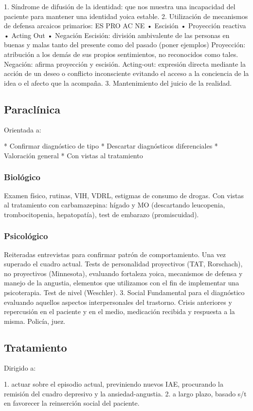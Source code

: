 \documentclass{scrbook}
\begin{document}
1. Síndrome de difusión de la identidad: que nos muestra una incapacidad del paciente para mantener una identidad yoica estable.
2. Utilización de mecanismos de defensa arcaicos primarios: ES PRO AC NE • Escisión • Proyección reactiva • Acting Out • Negación Escisión: división ambivalente de las personas en buenas y malas tanto del presente como del pasado (poner ejemplos) Proyección: atribución a los demás de sus propios sentimientos, no reconocidos como tales. Negación: afirma proyección y escisión. Acting-out: expresión directa mediante la acción de un deseo o conflicto inconsciente evitando el acceso a la conciencia de la idea o el afecto que la acompaña.
3. Mantenimiento del juicio de la realidad.
\subsection*{Paraclínica}
Orientada a:

* Confirmar diagnóstico de tipo
* Descartar diagnósticos diferenciales
* Valoración general
* Con vistas al tratamiento

\subsubsection*{Biológico}
Examen físico, rutinas, VIH, VDRL, estigmas de consumo de drogas. Con vistas al tratamiento con carbamazepina: hígado y MO (descartando leucopenia, trombocitopenia, hepatopatía), test de embarazo (promiscuidad).
\subsubsection*{Psicológico}
Reiteradas entrevistas para confirmar patrón de comportamiento. Una vez superado el cuadro actual. Tests de personalidad proyectivos (TAT, Rorschach), no proyectivos (Minnesota), evaluando fortaleza yoica, mecanismos de defensa y manejo de la angustia, elementos que utilizamos con el fin de implementar una psicoterapia. Test de nivel (Weschler). 3. Social Fundamental para el diagnóstico evaluando aquellos aspectos interpersonales del trastorno. Crisis anteriores y repercusión en el paciente y en el medio, medicación recibida y respuesta a la misma. Policía, juez.
\subsection*{Tratamiento}

Dirigido a:

1. actuar sobre el episodio actual, previniendo nuevos IAE, procurando la remisión del cuadro depresivo y la ansiedad-angustia.
2. a largo plazo, basado s/t en favorecer la reinserción social del paciente.
\end{document}
